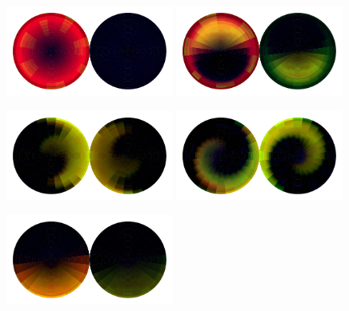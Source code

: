 \begin{figure}[h!]
    \begin{center}
        \includegraphics[width=0.49\textwidth]{figures/appendix_featurevis/TU1_9.pdf}
        \includegraphics[width=0.49\textwidth]{figures/appendix_featurevis/TU1_10.pdf}
    \end{center}
    \begin{center}
        \includegraphics[width=0.49\textwidth]{figures/appendix_featurevis/TU1_37.pdf}
        \includegraphics[width=0.49\textwidth]{figures/appendix_featurevis/TU1_45.pdf}
    \end{center}
    \begin{center}
        \includegraphics[width=0.49\textwidth]{figures/appendix_featurevis/TU1_55.pdf}

\end{center}
\end{figure}

